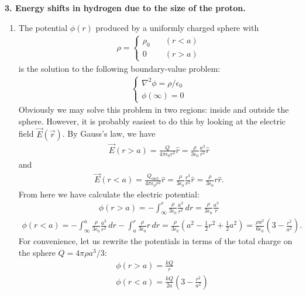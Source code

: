 \documentclass{article}
\theoremstyle{definition}
\newcommand{\f}[2]{\frac{#1}{#2}}
\newcommand{\lp}{\left(}
\newcommand{\rp}{\right)}
\begin{document}
\noindent \textbf{3. Energy shifts in hydrogen due to the size of the proton.}


\begin{enumerate}[label=(\alph*)]
	\item The potential $\phi(r)$ produced by a uniformly charged sphere with
	\begin{align*}
	\rho = \begin{cases}
	\rho_0 &\quad (r<a) \\ 
	0 &\quad (r>a)
	\end{cases}
	\end{align*}
	is the solution to the following boundary-value problem:
	\begin{align*}
	\begin{cases}
	\nabla^2 \phi = \rho/\epsilon_0 \\
	\phi(\infty) = 0
	\end{cases}
	\end{align*}
	Obviously we may solve this problem in two regions: inside and outside the sphere. However, it is probably easiest to do this by looking at the electric field $\vec{E}(\vec{r})$. By Gauss's law, we have
	\begin{align*}
	\vec{E}(r>a) = \f{Q}{4\pi \epsilon_0 r^2} \hat{r} = \f{\rho}{3 \epsilon_0 } \f{a^3}{r^2} \hat{r}
	\end{align*}
	and 
	\begin{align*}
	\vec{E}(r<a) = \f{Q_\text{encl}}{4\pi \epsilon_0 r^2} \hat{r} = \f{\rho}{ 3\epsilon_0} \f{r^3}{r^2} \hat{r} = \f{\rho}{3\epsilon_0} r \hat{r}.
	\end{align*}
	From here we have calculate the electric potential:
	\begin{align*}
	\phi(r>a) = -\int_\infty^r \f{\rho}{3 \epsilon_0 } \f{a^3}{r^2} \,dr = \f{\rho}{3\epsilon_0} \f{a^3}{r}  
	\end{align*}
	\begin{align*}
	\phi(r<a) = -\int_\infty^a \f{\rho}{3 \epsilon_0 } \f{a^3}{r^2} \,dr -\int_a^r \f{\rho}{3\epsilon_0} r\,dr = \f{\rho}{3\epsilon_0} \lp a^2 - \f{1}{2}r^2 + \f{1}{2}a^2 \rp = \f{\rho a^2}{6\epsilon_0} \lp 3 - \f{r^2}{a^2} \rp. 
	\end{align*}
	For convenience, let us rewrite the potentials in terms of the total charge on the sphere $Q = 4\pi \rho a^3/3$:
	\begin{align*}
	&\phi(r>a) = \f{kQ}{r} \\
	&\phi(r<a) = \f{kQ}{2a}\lp 3 - \f{r^2}{a^2} \rp  
	\end{align*}
	

\end{enumerate}
\end{document}
